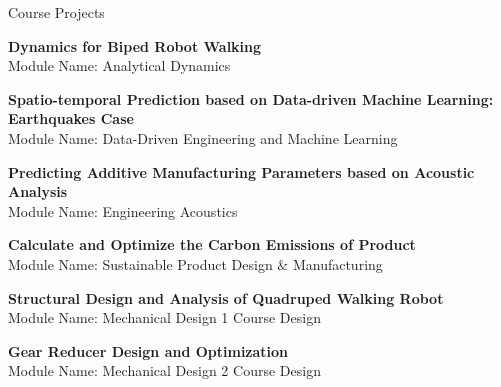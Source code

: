 \documentclass{resume} %
\begin{document}
\begin{rSection}{Course Projects }
	
\begin{rSubsection}{}{}
{}{}
\item {{\bf Dynamics for Biped Robot Walking}\\ Module Name: Analytical Dynamics}\\
    
\item {{\bf Spatio-temporal Prediction based on Data-driven Machine Learning: Earthquakes Case}\\ Module Name: Data-Driven Engineering and Machine Learning}\\

\item {{\bf Predicting Additive Manufacturing Parameters based on Acoustic Analysis}\\ Module Name: Engineering Acoustics}\\

\item {{\bf Calculate and Optimize the Carbon Emissions of Product}\\ Module Name: Sustainable Product Design $\&$ Manufacturing}\\

\item {{\bf Structural Design and Analysis of Quadruped Walking Robot} \\ Module Name: Mechanical Design 1 Course Design}\\

\item {{\bf Gear Reducer Design and Optimization}\\ Module Name: Mechanical Design 2 Course Design}\\
\end{rSubsection}

	
\end{rSection}
\newpage
\end{document}
